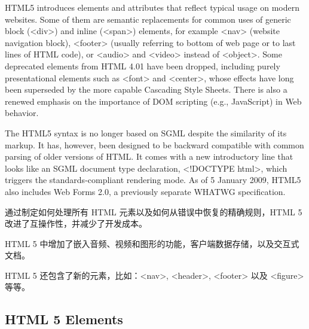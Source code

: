 HTML5 introduces elements and attributes that reflect typical usage on modern websites. Some of them are semantic replacements for common uses of generic block (<div>) and inline (<span>) elements, for example <nav> (website navigation block), <footer> (usually referring to bottom of web page or to last lines of HTML code), or <audio> and <video> instead of <object>. Some deprecated elements from HTML 4.01 have been dropped, including purely presentational elements such as <font> and <center>, whose effects have long been superseded by the more capable Cascading Style Sheets. There is also a renewed emphasis on the importance of DOM scripting (e.g., JavaScript) in Web behavior.

The HTML5 syntax is no longer based on SGML despite the similarity of its markup. It has, however, been designed to be backward compatible with common parsing of older versions of HTML. It comes with a new introductory line that looks like an SGML document type declaration, <!DOCTYPE html>, which triggers the standards-compliant rendering mode. As of 5 January 2009, HTML5 also includes Web Forms 2.0, a previously separate WHATWG specification.

通过制定如何处理所有 HTML 元素以及如何从错误中恢复的精确规则，HTML 5 改进了互操作性，并减少了开发成本。

HTML 5 中增加了嵌入音频、视频和图形的功能，客户端数据存储，以及交互式文档。

HTML 5 还包含了新的元素，比如：<nav>, <header>, <footer> 以及 <figure> 等等。


\subsection{HTML 5 Elements}


